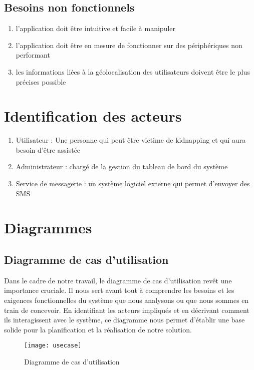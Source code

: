 \subsection{Besoins non fonctionnels}
\begin{enumerate}
	\item l’application doit être intuitive et facile à manipuler
	\item l’application doit être en mesure de fonctionner sur des périphériques non performant 
	\item les informations liées à la géolocalisation des utilisateurs doivent être le plus précises possible
\end{enumerate}

\section{Identification des acteurs}	
\begin{enumerate}
	\item Utilisateur : Une personne qui peut être victime de kidnapping et qui aura besoin d’être assistée
	\item Administrateur : chargé de la gestion du tableau de bord du système
	\item Service de messagerie : un système logiciel externe qui permet d’envoyer des SMS
\end{enumerate}

\section{Diagrammes}
\subsection{Diagramme de cas d’utilisation}
Dans le cadre de notre travail, le diagramme de cas d'utilisation revêt une importance cruciale. Il nous sert avant tout à comprendre les besoins et les exigences fonctionnelles du système que nous analysons ou que nous sommes en train de concevoir. En identifiant les acteurs impliqués et en décrivant comment ils interagissent avec le système, ce diagramme nous permet d'établir une base solide pour la planification et la réalisation de notre solution.

\begin{figure}[H]
	\texttt{[image: usecase]}
	\caption{Diagramme de cas d’utilisation}
\end{figure}

